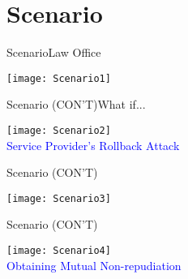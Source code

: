 \section{Scenario}

\begin{frame}{Scenario}{Law Office}
	\begin{center}
		\texttt{[image: Scenario1]}
	\end{center}
\end{frame}

\begin{frame}{Scenario (CON'T)}{What if...}
	\begin{center}
		\texttt{[image: Scenario2]}\\
        \textcolor{blue}{Service Provider's Rollback Attack}
	\end{center}
\end{frame}

\begin{frame}{Scenario (CON'T)}
	\begin{center}
		\texttt{[image: Scenario3]}
	\end{center}
\end{frame}

\begin{frame}{Scenario (CON'T)}
	\begin{center}
		\texttt{[image: Scenario4]}\\
        \textcolor{blue}{Obtaining Mutual Non-repudiation}
	\end{center}
\end{frame}